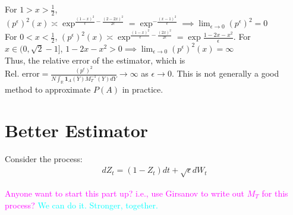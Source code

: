 \documentclass[11pt]{amsart}
\newcommand{\want}{p^{\epsilon}}
\newcommand{\noise}{\sqrt{\epsilon}}
\newcommand{\ind}{\mathbf{1}}
\newcommand{\R}{\mathbb{R}}
\newcommand{\kknote}[1]{{\textcolor{magenta}{#1}}}
\newcommand{\ydnote}[1]{{\textcolor{cyan}{#1}}}
\begin{document}
For $1 > x > \frac{1}{2}$, $(\want)^2(x) \asymp \exp^{\frac{(1-x)^2}{\epsilon}-\frac{(2-2x)^2}{2\epsilon}} = \exp^{-\frac{(x-1)^2}{\epsilon}} \implies \lim_{\epsilon \to 0} (\want)^2 = 0$
\\
For $0 < x < \frac{1}{2}$, $(\want)^2(x) \asymp \exp^{\frac{(1-x)^2}{\epsilon}-\frac{(2x)^2}{2\epsilon}} = \exp{\frac{1-2x-x^2}{\epsilon}}$. For $x \in (0,\sqrt{2}-1]$, $1-2x-x^2 > 0 \implies \lim_{\epsilon \to 0} (\want)^2(x) = \infty$ 
\\
Thus, the relative error of the estimator, which is $\text{Rel. error} = \frac{(\want)^2}{N\int_{\R}\ind_{A}(Y)M^{-1}_{T}(Y) dY} \to \infty$ as $\epsilon \to 0$. This is not generally a good method to approximate $P(A)$ in practice. 

\section{Better Estimator}
Consider the process: 
\begin{align*}
dZ_t = (1-Z_t)dt + \noise dW_t
\end{align*}

\kknote{Anyone want to start this part up? i.e., use Girsanov to write out $M_T$ for this process?}
\ydnote{We can do it. Stronger, together.}
\end{document}
